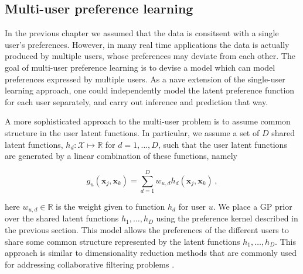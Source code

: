 
\subsection{Multi-user preference learning}

In the previous chapter we assumed that the data is consitsent with a single user's preferences. However, in many real time applications the data is actually produced by multiple users, whose preferences may deviate from each other. The goal of multi-user preference learning is to devise a model which can model preferences expressed by multiple users. As a nave extension of the single-user learning approach, one could independently model the latent preference function  for each user separately, and carry out inference and prediction that way. 

A more sophisticated approach to the multi-user problem is to assume common structure in the user latent functions. In particular, we assume a set of $D$ shared latent functions, $h_d:\mathcal{X} \mapsto \mathbb{R}$ for $d=1,\ldots,D$, such that the user latent functions are  generated by a linear combination of these functions, namely

\begin{equation}
	g_{u}(\mathbf{x}_j,\mathbf{x}_k)=\sum_{d=1}^{D}w_{u,d}h_{d}(\mathbf{x}_j,\mathbf{x}_k)\,,\label{eqn:preference_expressionG}
\end{equation}

here $w_{u,d}\in \mathbb{R}$ is the weight given to function $h_d$ for user $u$. We place a GP prior over the shared latent functions $h_{1},\ldots,h_{D}$ using the preference kernel described in the previous section. This model allows the preferences of the different users to share some common structure represented by the latent functions $h_{1},\ldots,h_{D}$. This approach is similar to dimensionality reduction methods that are commonly used for addressing collaborative filtering problems \cite{stern2009,raiko2007}.

